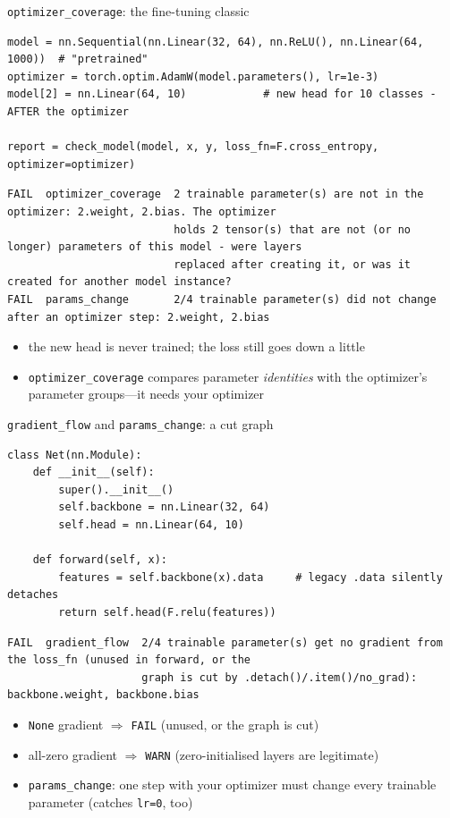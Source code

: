 \documentclass[aspectratio=169,11pt]{beamer}
\newcommand{\WARN}{\textcolor{warn}{\texttt{WARN}}}
\newcommand{\FAIL}{\textcolor{fail}{\texttt{FAIL}}}
\newcommand{\chk}[1]{\texttt{#1}}
\begin{document}
\begin{frame}[fragile]{\chk{optimizer\_coverage}: the fine-tuning classic}
  \begin{lstlisting}
model = nn.Sequential(nn.Linear(32, 64), nn.ReLU(), nn.Linear(64, 1000))  # "pretrained"
optimizer = torch.optim.AdamW(model.parameters(), lr=1e-3)
model[2] = nn.Linear(64, 10)            # new head for 10 classes - AFTER the optimizer

report = check_model(model, x, y, loss_fn=F.cross_entropy, optimizer=optimizer)
  \end{lstlisting}
  \begin{lstlisting}[style=report]
FAIL  optimizer_coverage  2 trainable parameter(s) are not in the optimizer: 2.weight, 2.bias. The optimizer
                          holds 2 tensor(s) that are not (or no longer) parameters of this model - were layers
                          replaced after creating it, or was it created for another model instance?
FAIL  params_change       2/4 trainable parameter(s) did not change after an optimizer step: 2.weight, 2.bias
  \end{lstlisting}
  \begin{itemize}
    \item the new head \alert{is never trained}; the loss still goes down a little
    \item \chk{optimizer\_coverage} compares parameter \emph{identities} with the optimizer's
          parameter groups---it needs \alert{your} optimizer
  \end{itemize}
\end{frame}

\begin{frame}[fragile]{\chk{gradient\_flow} and \chk{params\_change}: a cut graph}
  \begin{lstlisting}
class Net(nn.Module):
    def __init__(self):
        super().__init__()
        self.backbone = nn.Linear(32, 64)
        self.head = nn.Linear(64, 10)

    def forward(self, x):
        features = self.backbone(x).data     # legacy .data silently detaches
        return self.head(F.relu(features))
  \end{lstlisting}
  \begin{lstlisting}[style=report]
FAIL  gradient_flow  2/4 trainable parameter(s) get no gradient from the loss_fn (unused in forward, or the
                     graph is cut by .detach()/.item()/no_grad): backbone.weight, backbone.bias
  \end{lstlisting}
  \begin{itemize}
    \item \texttt{None} gradient $\Rightarrow$ \FAIL{} (unused, or the graph is cut)
    \item all-zero gradient $\Rightarrow$ \WARN{} (zero-initialised layers are legitimate)
    \item \chk{params\_change}: one step with \alert{your} optimizer must change every
          trainable parameter (catches \texttt{lr=0}, too)
  \end{itemize}
\end{frame}
\end{document}
